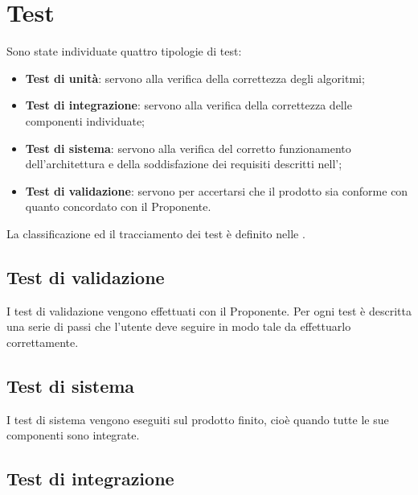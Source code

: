 \documentclass[../PianoDiQualifica.tex]{subfiles}
\begin{document}
	\section{Test}\label{Test}
		Sono state individuate quattro tipologie di test:
		\begin{itemize}
			\item \textbf{Test di unità}: servono alla verifica della correttezza degli algoritmi;
			\item \textbf{Test di integrazione}: servono alla verifica della correttezza delle
			componenti individuate;
			\item \textbf{Test di sistema}: servono alla verifica del corretto funzionamento
			dell'architettura e della soddisfazione dei requisiti descritti nell'\analisideirequisiti;
			\item \textbf{Test di validazione}: servono per accertarsi che il prodotto sia conforme
			con quanto concordato con il Proponente.
		\end{itemize}
		La classificazione ed il tracciamento dei test è definito nelle \normediprogettov.
		\subsection{Test di validazione}
			I test di validazione vengono effettuati con il Proponente. Per ogni test è descritta
			una serie di passi che l'utente deve seguire in modo tale da effettuarlo correttamente. 
		\subsection{Test di sistema}
			I test di sistema vengono eseguiti sul prodotto finito, cioè quando tutte le sue componenti
			sono integrate. 
		\subsection{Test di integrazione}
\end{document}
